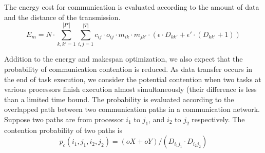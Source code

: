 The energy cost for communication is evaluated according to the amount of data and the distance of the transmission. 
\begin{equation}\label{eq:ecomm}
E_m = N\cdot  \sum^{|P'|}_{k,k'=1} \sum^{|T|}_{i,j=1} c_{ij}\cdot o_{ij}\cdot m_{ik}\cdot m_{jk'}\cdot (\epsilon\cdot  D_{kk'}+ \epsilon'\cdot (D_{kk'}+1))
\end{equation}

Addition to the energy and makespan optimization, we also expect that the probability of communication contention is reduced. As data transfer occurs in the end of task execution, we consider the potential contention when two tasks at various processors finish execution almost simultaneously (their difference is less than a limited time bound. The probability is evaluated according to the overlapped path between two communication paths in a communication network. Suppose two paths are from processor $i_1$ to $j_1$, and $i_2$ to $j_2$ respectively.  
The contention probability of two paths is 
\begin{equation}
p_c({i_1},{j_1},{i_2},{j_2})=(oX+ oY)/(D_{{i_1}{j_1}}\cdot D_{{i_2}{j_2}})
\end{equation}

